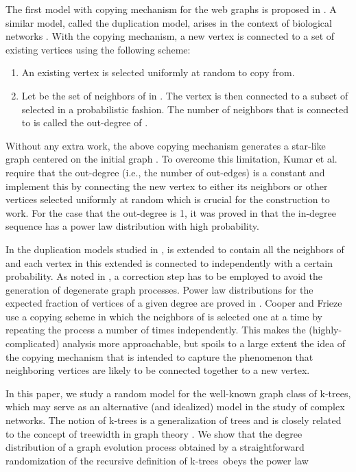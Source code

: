 \documentclass[11pt]{article}
\providecommand{\ktrees}{k-trees}
\begin{document}
The first model with copying mechanism for the web graphs is proposed in \cite{kumar}.  A similar model, called the duplication model, arises in the context of biological networks \cite{chung03}.
With the copying mechanism,  a new vertex  is connected
to a set of existing vertices using the following scheme:
\begin{enumerate}
\item An existing vertex  is selected uniformly at random to copy from.
\item Let  be the set of neighbors of  in .
The vertex  is then connected to a subset of  selected in a probabilistic fashion.
The number of neighbors that  is connected to is called the out-degree of .
\end{enumerate}
Without any extra work, the above copying mechanism generates a star-like graph centered on the initial graph .
To overcome this limitation, Kumar et al. \cite{kumar} require that the out-degree (i.e., the number of out-edges) is a constant
and implement this by connecting the new vertex to either its neighbors or other vertices selected uniformly at random  which is crucial for the construction to work.
For the case that the out-degree is 1, it was proved in \cite{kumar} that the in-degree sequence has a power law distribution with high probability.

In the duplication models studied in \cite{chung03,bebek06},  is extended to contain all the neighbors of  and each vertex in this extended  is
connected to  independently with a certain probability. As noted in \cite{bebek06}, a correction step has to be employed to avoid the generation
of degenerate graph processes.  Power law distributions for the expected fraction of vertices of a given degree are proved
in \cite{chung03,bebek06}. 
Cooper and Frieze \cite{cooper03} use a copying scheme in which the neighbors of  is selected one at a time
by repeating the process a number of times independently. This makes the (highly-complicated) analysis
more approachable, but spoils to a large extent the idea of
the copying mechanism that is intended to capture the phenomenon that neighboring vertices are likely to be connected together to a new vertex.

In this paper, we study a random model for the well-known graph class of \ktrees,
which may serve as an alternative (and idealized) model in the study of complex networks.
The notion of k-trees is a generalization of trees and is closely related to the concept of treewidth in graph theory \cite{kloks94}.
We show that the degree distribution of a graph evolution process obtained by a straightforward randomization of the recursive definition of \ktrees\ obeys the power law
\end{document}
